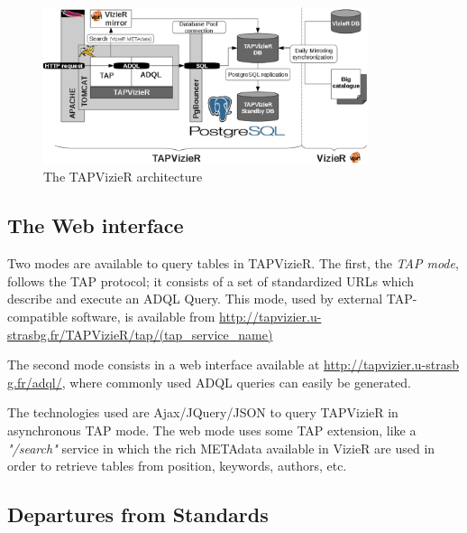 \begin{figure}[hbp] \center
\includegraphics[width=0.85\textwidth]{part8/Landais_P44/P044_fig1.eps}
\caption{The TAPVizieR architecture}\label{P044:architecture}
\end{figure}

\subsection{The Web interface}
\label{P044:web_interface}
Two modes are available to query tables in TAPVizieR. The first, the {\em {}TAP mode}, follows the TAP protocol; it consists of a set of standardized URLs which describe and execute an ADQL Query. This mode, used by external TAP-compatible software, is available from {\small\url{http://tapvizier.u-strasbg.fr/TAPVizieR/tap/(tap_service_name)}}

The second mode consists in a web interface available at {\small\url{http://tapvizier.u-strasb} \url{g.fr/adql/}}, where commonly used ADQL queries can easily be generated.

The technologies used are Ajax/JQuery/JSON to query TAPVizieR in asynchronous TAP mode. The web mode uses some TAP extension, like a \textit{"/search"} service in which the rich METAdata available in VizieR are used in order to retrieve tables from position, keywords, authors, etc.


\subsection{Departures from Standards}

